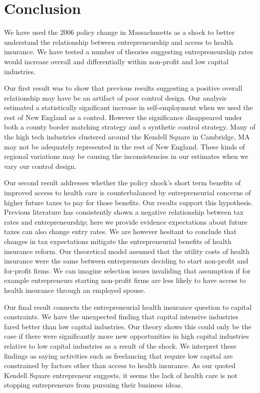 \documentclass[12pt]{article}
\begin{document}
\section{Conclusion}
\label{sec:conclude}

We have used the 2006 policy change in Massachusetts as a shock to better understand the relationship between entrepreneurship and access to health insurance. We have tested a number of theories suggesting entrepreneurship rates would increase overall and differentially within non-profit and low capital industries. 

Our first result was to show that previous results suggesting a positive overall relationship may have be an artifact of poor control design. Our analysis estimated a statistically significant increase in self-employment when we used the rest of New England as a control. However the significance disappeared under both a county border matching strategy and a synthetic control strategy. Many of the high tech industries clustered around the Kendell Square in Cambridge, MA may not be adequately represented in the rest of New England. These kinds of regional variations may be causing the inconsistencies in our estimates when we vary our control design. 

Our second result addresses whether the policy shock's short term benefits of improved access to health care is counterbalanced by entrepreneurial concerns of higher future taxes to pay for those benefits. Our results support this hypothesis. Previous literature  has consistently shown a negative relationship between tax rates and entrepreneurship; here we provide evidence expectations about future taxes can also change entry rates. We are however hesitant to conclude that changes in tax expectations mitigate the entrepreneurial benefits of health insurance reform. Our theoretical model assumed that the utility costs of health insurance were the same between entrepreneurs deciding to start non-profit and for-profit firms. We can imagine selection issues invaliding that assumption if for example entrepreneurs starting non-profit firms are less likely to have access to health insurance through an employed spouse. 

Our final result connects the entrepreneurial health insurance question to capital constraints. We have the unexpected finding that capital intensive industries fared better than low capital industries. Our theory shows this could only be the case if there were significantly more new opportunities in high capital industries relative to low capital industries as a result of the shock. We interpret these findings as saying activities such as freelancing that require low capital are constrained by factors other than access to health insurance. As our quoted Kendell Square entrepreneur suggests, it seems the lack of health care is not stopping entrepreneurs from pursuing their business ideas. 
\end{document}
